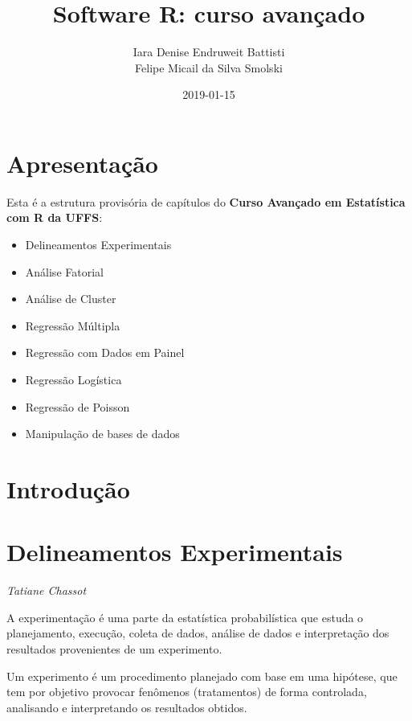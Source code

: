\documentclass[12pt,brazil,oneside]{book}
\title{Software R: curso avançado}
\author{Iara Denise Endruweit Battisti \\ Felipe Micail da Silva Smolski}
\date{2019-01-15}
\providecommand{\tightlist}{%
  \setlength{\itemsep}{0pt}\setlength{\parskip}{0pt}}
\begin{document}
\maketitle

{
\setcounter{tocdepth}{1}
\tableofcontents
}
\hypertarget{apresentacao}{%
\chapter*{Apresentação}\label{apresentacao}}

\frenchspacing

Esta é a estrutura provisória de capítulos do \textbf{Curso Avançado em Estatística com R da UFFS}:

\begin{itemize}
\tightlist
\item
  Delineamentos Experimentais
\item
  Análise Fatorial
\item
  Análise de Cluster
\item
  Regressão Múltipla
\item
  Regressão com Dados em Painel
\item
  Regressão Logística
\item
  Regressão de Poisson
\item
  Manipulação de bases de dados
\end{itemize}

\hypertarget{introducao}{%
\chapter*{Introdução}\label{introducao}}

\hypertarget{delineamentos-experimentais}{%
\chapter{Delineamentos Experimentais}\label{delineamentos-experimentais}}

\emph{Tatiane Chassot}

A experimentação é uma parte da estatística probabilística que estuda o planejamento, execução, coleta de dados, análise de dados e interpretação dos resultados provenientes de um experimento.

Um experimento é um procedimento planejado com base em uma hipótese, que tem por objetivo provocar fenômenos (tratamentos) de forma controlada, analisando e interpretando os
resultados obtidos.
\end{document}
